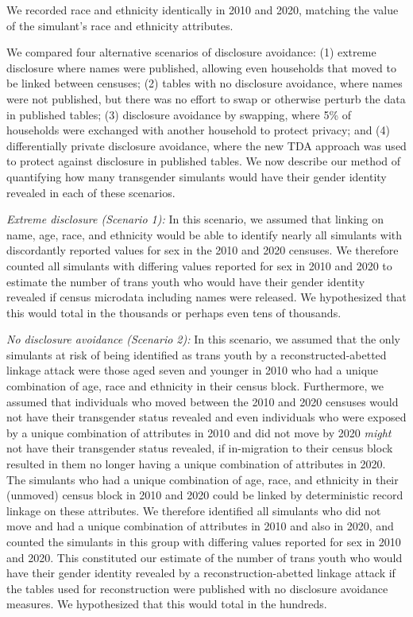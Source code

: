 \documentclass{jpc} %
\theoremstyle{plain}\newtheorem{satz}[thm]{Satz} %
\begin{document}
We recorded race and ethnicity identically in 2010 and 2020, matching the value of the simulant's race and ethnicity attributes.

We compared four alternative scenarios of disclosure avoidance: (1) extreme disclosure where names were published, allowing even households that moved to be linked between censuses; (2) tables with no disclosure avoidance, where names were not published, but there was no effort to swap or otherwise perturb the data in published tables; (3) disclosure avoidance by swapping, where 5\% of households were exchanged with another household to protect privacy; and (4) differentially private disclosure avoidance, where the new TDA approach was used to protect against disclosure in published tables.  We now describe our method of quantifying how many transgender simulants would have their gender identity revealed in each of these scenarios.

\emph{Extreme disclosure (Scenario 1):} In this scenario, we assumed that linking on name, age, race, and ethnicity would be able to identify nearly all simulants with discordantly reported values for sex in the 2010 and 2020 censuses.  We therefore counted all simulants with differing values reported for sex in 2010 and 2020 to estimate the number of trans youth who would have their gender identity revealed if census microdata including names were released.  We hypothesized that this would total in the thousands or perhaps even tens of thousands.

\emph{No disclosure avoidance (Scenario 2):} In this scenario, we assumed that the only simulants at risk of being identified as trans youth by a reconstructed-abetted linkage attack were those aged seven and younger in 2010 who had a unique combination of age, race and ethnicity in their census block.  Furthermore, we assumed that individuals who moved between the 2010 and 2020 censuses would not have their transgender status revealed and even individuals who were exposed by a unique combination of attributes in 2010 and did not move by 2020 \emph{might} not have their transgender status revealed, if in-migration to their census block resulted in them no longer having a unique combination of attributes in 2020.  The simulants who had a unique combination of age, race, and ethnicity in their (unmoved) census block in 2010 and 2020 could be linked by deterministic record linkage on these attributes. We therefore identified all simulants who did not move and had a unique combination of attributes in 2010 and also in 2020, and counted the simulants in this group with differing values reported for sex in 2010 and 2020.  This constituted our estimate of the number of trans youth who would have their gender identity revealed by a reconstruction-abetted linkage attack if the tables used for reconstruction were published with no disclosure avoidance measures.
We hypothesized that this would total in the hundreds.
\end{document}
